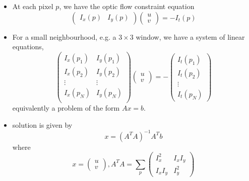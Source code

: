 \documentclass[twocolumn,landscape,10pt]{article}
\theoremstyle{definition}
\begin{document}
\begin{itemize}
    \item At each pixel $p$, we have the optic flow constraint equation
        \[
            \begin{pmatrix}
                I_x(p) & I_y(p)
            \end{pmatrix} 
            \begin{pmatrix}
                u \\
                v
            \end{pmatrix} 
            =
            -I_t(p)
        \]
    \item For a small neighbourhood, e.g. a $3\times 3$ window,
        we have a system of linear equations,
        \[
            \begin{pmatrix}
                I_x(p_1) & I_y(p_1) \\
                I_x(p_2) & I_y(p_2) \\
                \vdots & \vdots \\
                I_x(p_N) & I_y(p_N) \\
            \end{pmatrix} 
            \begin{pmatrix}
                u \\
                v
            \end{pmatrix} 
            =
            -\begin{pmatrix}
                    I_t(p_1) \\
                    I_t(p_2) \\
                    \vdots \\
                    I_t(p_N)
            \end{pmatrix} 
        \]
        equivalently a problem of the form $Ax=b$.
    \item solution is given by
        \begin{equation}\label{eq:optic_flow}
            x=(A^TA)^{-1}A^Tb
        \end{equation} 
        where
        \[
            x=\begin{pmatrix}
                u \\ 
                v
            \end{pmatrix} 
            ,A^TA=\sum_p
            \begin{pmatrix}
                I_x^2 & I_xI_y \\
                I_xI_y & I_y^2 
            \end{pmatrix} 
\]
\end{itemize}
\end{document}
